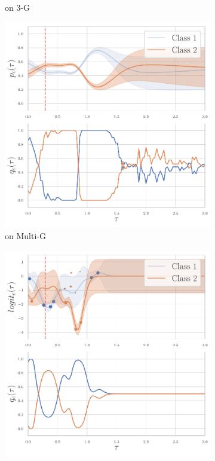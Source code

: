 \begin{figure}
\begin{subfigure}{.24\textwidth}
        \caption*{\GPModel on 3-G}
    \end{subfigure}
        \begin{subfigure}{.24\textwidth}
        \centering
        \includegraphics[width=\linewidth]{sections/010_neurips2019/paper/images/shifted-gaussians-multi-dirichlet.pdf}
        \caption*{\DirModel on Multi-G}
    \end{subfigure}
    \begin{subfigure}{.24\textwidth}
        \centering
        \includegraphics[width=\linewidth]{sections/010_neurips2019/paper/images/shifted-gaussians-multi-gaussian-process.pdf}

\end{subfigure}
\end{figure}
